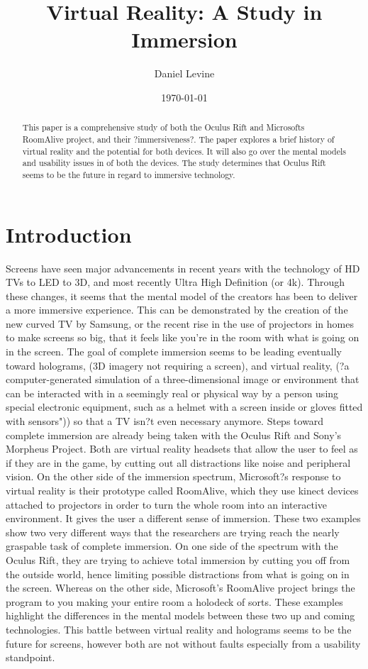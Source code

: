\documentclass[a4paper]{article}
\title{Virtual Reality: A Study in Immersion}
\author{Daniel Levine}
\date{\today}
\begin{document}
\maketitle

\begin{abstract}
\indent \indent This paper is a comprehensive study of both the Oculus Rift and Microsofts RoomAlive project, and their ?immersiveness?. The paper explores a brief history of virtual reality and the potential for both devices. It will also go over the mental models and usability issues in of both the devices. The study determines that Oculus Rift seems to be the future in regard to immersive technology. 

\end{abstract}

\section{Introduction}

\indent \indent Screens have seen major advancements in recent years with the technology of HD TVs to LED to 3D, and most recently Ultra High Definition (or 4k). Through these changes, it seems that the mental model of the creators has been to deliver a more immersive experience. This can be demonstrated by the creation of the new curved TV by Samsung, or the recent rise in the use of projectors in homes to make screens so big, that it feels like you're in the room with what is going on in the screen. The goal of complete immersion seems to be leading eventually toward holograms, (3D imagery not requiring a screen), and virtual reality, (?a computer-generated simulation of a three-dimensional image or environment that can be interacted with in a seemingly real or physical way by a person using special electronic equipment, such as a helmet with a screen inside or gloves fitted with sensors")\cite{1}) so that a TV isn?t even necessary anymore. Steps toward complete immersion are already being taken with the Oculus Rift and Sony's Morpheus Project. Both are virtual reality headsets that allow the user to feel as if they are in the game, by cutting out all distractions like noise and peripheral vision. On the other side of the immersion spectrum, Microsoft?s response to virtual reality is their prototype called RoomAlive, which they use kinect devices attached to projectors in order to turn the whole room into an interactive environment. It gives the user a different sense of immersion. These two examples show two very different ways that the researchers are trying reach the nearly graspable task of complete immersion. On one side of the spectrum with the Oculus Rift, they are trying to achieve total immersion by cutting you off from the outside world, hence limiting possible distractions from what is going on in the screen. Whereas on the other side, Microsoft's RoomAlive project brings the program to you making your entire room a holodeck of sorts. These examples highlight the differences in the mental models between these two up and coming technologies. This battle between virtual reality and holograms seems to be the future for screens, however both are not without faults especially from a usability standpoint.
\end{document}

